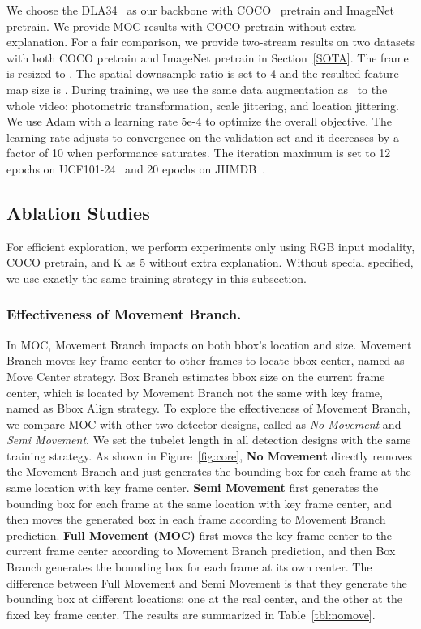 \documentclass[runningheads]{llncs}
\begin{document}
We choose the DLA34~\cite{DLA} as our backbone with COCO~\cite{lin2014microsoft} pretrain and ImageNet~\cite{deng2009imagenet} pretrain. We provide MOC results with COCO pretrain without extra explanation. For a fair comparison, we provide two-stream results on two datasets with both COCO pretrain and ImageNet pretrain in Section~\ref{SOTA}. The frame is resized to . The spatial downsample ratio  is set to 4 and the resulted feature map size is . During training, we use the same data augmentation as~\cite{kalogeiton2017action} to the whole video: photometric transformation, scale jittering, and location jittering. We use Adam with a learning rate 5e-4 to optimize the overall objective. The learning rate adjusts to convergence on the validation set and it decreases by a factor of 10 when performance saturates. The iteration maximum is set to 12 epochs on UCF101-24~\cite{UCF101} and 20 epochs on JHMDB~\cite{JHMDB}.

\subsection{Ablation Studies}\label{Ablation Study}
For efficient exploration, we perform experiments only using RGB input modality, COCO pretrain, and K as 5 without extra explanation. Without special specified, we use exactly the same training strategy in this subsection.

\subsubsection{Effectiveness of Movement Branch.}

In MOC, Movement Branch impacts on both bbox's location and size. Movement Branch moves key frame center to other frames to locate bbox center, named as Move Center strategy. Box Branch estimates bbox size on the current frame center, which is located by Movement Branch not the same with key frame, named as Bbox Align strategy. To explore the effectiveness of Movement Branch, we compare MOC with other two detector designs, called as {\em No Movement} and {\em Semi Movement}. We set the tubelet length  in all detection designs with the same training strategy. As shown in Figure~\ref{fig:core}, \textbf{No Movement} directly removes the Movement Branch and just generates the bounding box for each frame at the same location with key frame center. \textbf{Semi Movement} first generates the bounding box for each frame at the same location with key frame center, and then moves the generated box in each frame according to Movement Branch prediction.  \textbf{Full Movement (MOC)} first moves the key frame center to the current frame center according to Movement Branch prediction, and then Box Branch generates the bounding box for each frame at its own center. The difference between Full Movement and Semi Movement is that they generate the bounding box at different locations: one at the real center, and the other at the fixed key frame center. The results are summarized in Table~\ref{tbl:nomove}.
\end{document}
